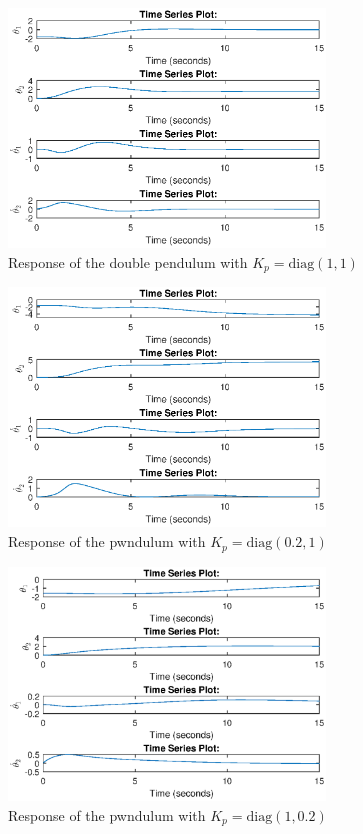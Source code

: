 \documentclass[a4paper]{scrartcl}
\begin{document}
\begin{figure}[ht]
	\centering
	\includegraphics[width=0.75\textwidth]{fig/2stiff_11.eps}
	\caption{Response of the double pendulum with $K_p = \text{diag}(1,1)$}
	\label{fig:2stiff1_1}
\end{figure}
\begin{figure}[ht]
	\centering
	\includegraphics[width=0.75\textwidth]{fig/2stiff_021}
	\caption{Response of the pwndulum with $K_p = \text{diag}(0.2,1)$}
	\label{fig:2stiff02_1}
\end{figure}
\begin{figure}[ht]
	\centering
	\includegraphics[width=0.75\textwidth]{fig/2stiff_102}
	\caption{Response of the pwndulum with $K_p = \text{diag}(1,0.2)$}
	\label{fig:2stiff1_02}
\end{figure}
\end{document}
